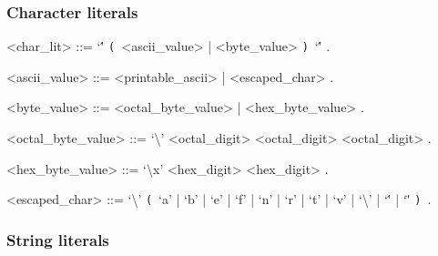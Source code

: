 \documentclass{article}
\def\lgrp{\synshortsoff\texttt{(}\synshorts~}
\def\rgrp{\synshortsoff\texttt{)}\synshorts~}
\begin{document}
\subsubsection*{Character literals}
\begin{grammar}
  <char_lit> ::= `\'' \lgrp <ascii_value> | <byte_value> \rgrp `\'' .

  <ascii_value> ::= <printable_ascii> | <escaped_char> .

  <byte_value> ::= <octal_byte_value> | <hex_byte_value> .

  <octal_byte_value> ::= `\textbackslash' <octal_digit> <octal_digit> <octal_digit> .

  <hex_byte_value> ::= `\textbackslash x' <hex_digit> <hex_digit> .

  <escaped_char> ::= `\textbackslash' \lgrp `a' | `b' | `e' | `f' | `n' | `r' | `t' | `v' | `\textbackslash' | `\'' | `\"' \rgrp .
\end{grammar}

\subsubsection*{String literals}
\end{document}
